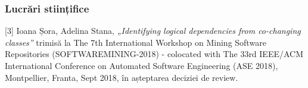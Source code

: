 \documentclass{beamer}
\begin{document}

 \begin{frame}
\frametitle{Lucrări stiințifice}
[3] Ioana Șora, Adelina Stana, \textit{„Identifying logical dependencies from co-changing classes”}  trimisă la The 7th International Workshop on Mining Software Repositories (SOFTWAREMINING-2018) - colocated with The 33rd IEEE/ACM International  Conference on Automated Software Engineering (ASE 2018), Montpellier, Franta, Sept 2018, în așteptarea deciziei de review.
\end{frame}



\end{document}
